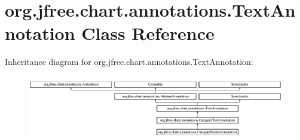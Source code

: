 \hypertarget{classorg_1_1jfree_1_1chart_1_1annotations_1_1_text_annotation}{}\section{org.\+jfree.\+chart.\+annotations.\+Text\+Annotation Class Reference}
\label{classorg_1_1jfree_1_1chart_1_1annotations_1_1_text_annotation}
Inheritance diagram for org.\+jfree.\+chart.\+annotations.\+Text\+Annotation\+:\begin{figure}[H]
\begin{center}
\leavevmode
\includegraphics[height=2.862986cm]{classorg_1_1jfree_1_1chart_1_1annotations_1_1_text_annotation}
\end{center}
\end{figure}
